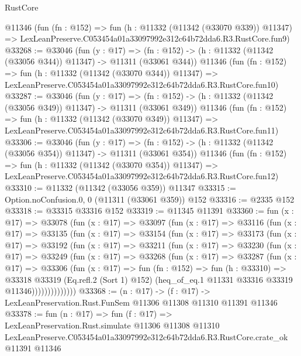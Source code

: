 \begin{lexlean}{RustCore}
\begin{coremodule}
    @11346
    (fun (fn : @152) =>
    fun (h : @11332 (@11342 (@33070 @339)) @11347) =>
    LexLeanPreserve.C053454a01a33097992e312c64b72dda6.R3.RustCore.fun9)
@33268 := @33046
    (fun (y : @17) =>
    (fn : @152) -> (h : @11332 (@11342 (@33056 @344)) @11347) -> @11311 (@33061 @344))
    @11346
    (fun (fn : @152) =>
    fun (h : @11332 (@11342 (@33070 @344)) @11347) =>
    LexLeanPreserve.C053454a01a33097992e312c64b72dda6.R3.RustCore.fun10)
@33287 := @33046
    (fun (y : @17) =>
    (fn : @152) -> (h : @11332 (@11342 (@33056 @349)) @11347) -> @11311 (@33061 @349))
    @11346
    (fun (fn : @152) =>
    fun (h : @11332 (@11342 (@33070 @349)) @11347) =>
    LexLeanPreserve.C053454a01a33097992e312c64b72dda6.R3.RustCore.fun11)
@33306 := @33046
    (fun (y : @17) =>
    (fn : @152) -> (h : @11332 (@11342 (@33056 @354)) @11347) -> @11311 (@33061 @354))
    @11346
    (fun (fn : @152) =>
    fun (h : @11332 (@11342 (@33070 @354)) @11347) =>
    LexLeanPreserve.C053454a01a33097992e312c64b72dda6.R3.RustCore.fun12)
@33310 := @11332 (@11342 (@33056 @359)) @11347
@33315 := Option.noConfusion.{0, 0} (@11311 (@33061 @359)) @152
@33316 := @2335 @152
@33318 := @33315 @33316 @152
@33319 := @11345 @11391
@33360 := fun (x : @17) =>
  @33078
    (fun (x : @17) =>
    @33097
      (fun (x : @17) =>
      @33116
        (fun (x : @17) =>
        @33135
          (fun (x : @17) =>
          @33154
            (fun (x : @17) =>
            @33173
              (fun (x : @17) =>
              @33192
                (fun (x : @17) =>
                @33211
                  (fun (x : @17) =>
                  @33230
                    (fun (x : @17) =>
                    @33249
                      (fun (x : @17) =>
                      @33268
                        (fun (x : @17) =>
                        @33287
                          (fun (x : @17) =>
                          @33306
                            (fun (x : @17) =>
                            fun (fn : @152) =>
                            fun (h : @33310) =>
                            @33318
                              @33319
                              (Eq.refl.{2} (Sort 1) @152)
                              (heq_of_eq.{1} @11331 @33316 @33319 @11346))))))))))))))
@33368 := (n : @17) ->
  (f : @17) -> LexLeanPreservation.Rust.FunSem @11306 @11308 @11310 @11391 @11346
@33378 := fun (n : @17) =>
  fun (f : @17) =>
  LexLeanPreservation.Rust.simulate
    @11306
    @11308
    @11310
    LexLeanPreserve.C053454a01a33097992e312c64b72dda6.R3.RustCore.crate_ok
    @11391
    @11346
\end{coremodule}
\end{lexlean}
